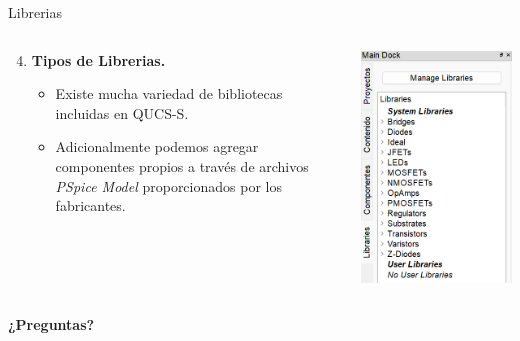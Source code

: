 \documentclass{beamer}
\begin{document}
\begin{frame}[fragile]{Librerias}

  \begin{columns}[T]
    \begin{column}{0.5\textwidth}
      \begin{enumerate}
        \setcounter{enumi}{3} %
        \item \textbf{Tipos de Librerias.}
          \begin{itemize}
            \item Existe mucha variedad de bibliotecas incluidas en QUCS-S.
            \item Adicionalmente podemos agregar componentes propios a través de archivos \textit{PSpice Model} proporcionados por los fabricantes.
          \end{itemize}
      \end{enumerate}
    \end{column}

    \begin{column}{0.4\textwidth}
      \includegraphics[width=\columnwidth]{Imagenes/Lib.png}
    \end{column}
  \end{columns}
\end{frame}

\begin{frame}
  \begin{center}
    \Huge \textbf{¿Preguntas?}
  \end{center}
\end{frame}
\end{document}
